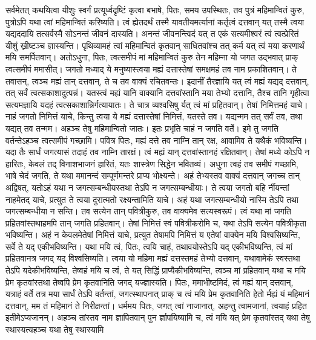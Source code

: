 \adhyAya
{}
\vakya सर्वमेतत् कथयित्वा यीशुः स्वर्गं प्रत्यूर्ध्वदृष्टिं कृत्वा बभाषे, पितः, समय उपस्थितः, तव पुत्रं महिमान्वितं कुरु, पुत्रोऽपि यथा त्वां महिमान्वितं करिष्यति।
\vakya त्वं ह्येतदर्थं तस्मै यावतीयमर्त्यानां कर्तृत्वं दत्तवान् यत् तस्मै त्वया यद्यददायि तत्सर्वस्मै सोऽनन्तं जीवनं दास्यति।
\vakya अनन्तं जीवनन्त्विदं यत् त एकं सत्यमीश्वरं त्वं त्वत्प्रेरितं यीशुं ख्रीष्टञ्च ज्ञास्यन्ति।
\vakya पृथिव्यामहं त्वां महिमान्वितं कृतवान् साधितवांश्च तत् कर्म यत् त्वं मया करणार्थं मयि समर्पितवान्।
\vakya अतोऽधुना, पितः, त्वत्समीपं मां महिमान्वितं कुरु तेन महिम्ना यो जगत उद्भवात् प्राक् त्वत्समीपं ममासीत्।
\vakya जगतो मध्याद् ये मनुष्यास्त्वया मह्यं दत्तास्तेषां समक्षमहं तव नाम प्रकाशितवान्। ते तवासन्, त्वञ्च मह्यं तान् दत्तवान्, ते च तव वाक्यं रचितवन्तः।
\vakya इदानीं तैरज्ञायि यत् त्वं मह्यं यद्यद् दत्तवान्, तत् सर्वं त्वत्सकाशादुत्पन्नं।
\vakya यतस्त्वं मह्यं यानि वाक्यानि दत्तवांस्तानि मया तेभ्यो दत्तानि, तैश्च तानि गृहीत्वा सत्यमज्ञायि यदहं त्वत्सकाशान्निर्गत्यायातः। ते चात्र व्यश्वसिषु र्यत् त्वं मां प्रहितवान्।
\vakya तेषां निमित्तमहं याचे। नाहं जगतो निमित्तं याचे, किन्तु त्वया ये मह्यं दत्तास्तेषां निमित्तं, यतस्ते तव।
\vakya यद्यन्मम तत् सर्वं तव, तथा यद्यत् तव तन्मम। अहञ्च तेषु महिमान्वितो जातः।
\vakya इतः प्रभृति चाहं न जगति वर्ते। इमे तु जगति वर्तन्तेऽहञ्च त्वत्समीपं गच्छामि। पवित्र पितः, मह्यं दत्ते तव नाम्नि तान् रक्ष, आवामिव ते यथैकं भविष्यन्ति।
\vakya यदा तैः सार्धं जगत्यासं तदाहं तव नाम्नि तारक्षं। त्वं मह्यं यान् दत्तवांस्तानहं रक्षितवान्। तेषां मध्ये कोऽपि न हारितः, केवलं तद् विनाशभाजनं हारितं, यतः शास्त्रेण सिद्धेन भवितव्यं।
\vakya अधुना त्वहं तव समीपं गच्छामि, भाषे चेदं जगति, ते यथा ममानन्दं सम्पूर्णमन्तरे प्राप्य भोक्ष्यन्ते।
\vakya अहं तेभ्यस्तव वाक्यं दत्तवान् जगच्च तान् अद्विषत्, यतोऽहं यथा न जगत्सम्बन्धीयस्तथा तेऽपि न जगत्सम्बन्धीयाः।
\vakya ते त्वया जगतो बहि र्नीयन्तां नाहमेतद् याचे, प्रत्युत ते त्वया दुरात्मतो रक्ष्यन्तामिति याचे।
\vakya अहं यथा जगत्सम्बन्धीयो नास्मि तेऽपि तथा जगत्सम्बन्धीया न सन्ति।
\vakya तव सत्येन तान् पवित्रीकुरु, तव वाक्यमेव सत्यस्वरूपं।
\vakya त्वं यथा मां जगति प्रहितवांस्तथाहमपि तान् जगति प्रहितवान्।
\vakya तेषां निमित्तं स्वं पवित्रीकरोमि च, यथा तेऽपि सत्येन पवित्रीकृता भविष्यन्ति।
\vakya अहं न केवलमेतेषां निमित्तं याचे, प्रत्युत तेषामपि निमित्तं य एतेषां वाक्येन मयि विश्वसिष्यन्ति,
\vakya सर्वे ते यद् एकीभविष्यन्ति। यथा मयि त्वं, पितः, त्वयि चाहं, तथावयोस्तेऽपि यद् एकीभविष्यन्ति, त्वं मां प्रहितवानत्र जगद् यद् विश्वसिष्यति।
\vakya त्वया यो महिमा मह्यं दत्तस्तमहं तेभ्यो दत्तवान्, यथावामेकं स्वस्तथा तेऽपि यदेकीभविष्यन्ति,
\vakya तेष्वहं मयि च त्वं, ते यत् सिद्धिं प्राप्यैकीभविष्यन्ति, त्वञ्च मां प्रहितवान् यथा च मयि प्रेम कृतवांस्तथा तेष्वपि प्रेम कृतवानिति जगद् यज्ज्ञास्यति।
\vakya पितः, ममाभीष्टमिदं, त्वं मह्यं यान् दत्तवान्, यत्राहं वर्ते तत्र मया सार्धं तेऽपि वर्तन्तां, जगत्स्थापनात् प्राक् च त्वं मयि प्रेम कृतवानिति हेतो र्मह्यं यं महिमानं दत्तवान्, मम तं महिमानं ते निरीक्षन्तां।
\vakya धर्ममय पितः, जगत् त्वां नाजानात्, अहन्तु त्वामजानां, त्वयाहं प्रहित इतीमेऽप्यजानन्।
\vakya अहञ्च तांस्तव नाम ज्ञापितवान् पुन र्ज्ञापयिष्यामि च, त्वं मयि यत् प्रेम कृतवांस्तद् यथा तेषु स्थास्यत्यहञ्च यथा तेषु स्थास्यामि\eoc